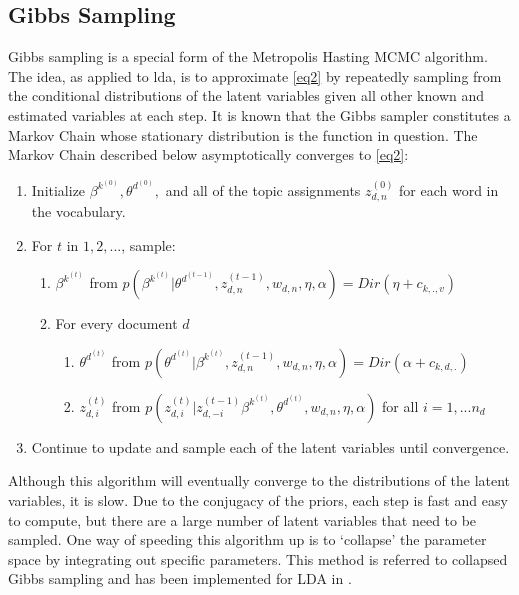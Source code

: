 \documentclass[12pt]{report}
\begin{document}
\begin{flushleft}
\section{Gibbs Sampling}
Gibbs sampling is a special form of the Metropolis Hasting MCMC algorithm. The idea, as applied to lda, is to approximate \ref{eq2} by repeatedly sampling from the conditional distributions of the latent variables given all other known and estimated variables at each step. It is known that the Gibbs sampler constitutes a Markov Chain whose stationary distribution is the function in question. The Markov Chain described below asymptotically converges to \ref{eq2}:
\begin{enumerate}
	\item Initialize $\beta^{k^{(0)}}, \theta^{d^{(0)}},$ and all of the topic assignments $z_{d,n}^{(0)}$ for each word in the vocabulary.
	\item For $t$ in $1,2,...$, sample:
	\begin{enumerate}
		\item $\beta^{k^{(t)}}$ from $p(\beta^{k^{(t)}} | \theta^{d^{(t-1)}}, z_{d,n}^{(t-1)}, w_{d,n}, \eta, \alpha)=Dir(\eta+c_{k,.,v})$
		\item For every document $d$ 
		\begin{enumerate}
			\item $\theta^{d^{(t)}}$ from $p(\theta^{d^{(t)}} | \beta^{k^{(t)}}, z_{d,n}^{(t-1)}, w_{d,n}, \eta, \alpha)=Dir(\alpha+c_{k,d,.})$
			\item $z^{(t)}_{d,i}$ from $p(z_{d,i}^{(t)} | z^{(t-1)}_{d,-i} \beta^{k^{(t)}}, \theta^{d^{(t)}}, w_{d,n}, \eta, \alpha)$ for all $i=1,...n_{d}$ 
		\end{enumerate}
	\end{enumerate}
	\item Continue to update and sample each of the latent variables until convergence.
\end{enumerate}

Although this algorithm will eventually converge to the distributions of the latent variables, it is slow. Due to the conjugacy of the priors, each step is fast and easy to compute, but there are a large number of latent variables that need to be sampled. One way of speeding this algorithm up is to `collapse' the parameter space by integrating out specific parameters. This method is referred to collapsed Gibbs sampling and has been implemented for LDA in \cite{CGS}. 


\end{flushleft}
\end{document}
